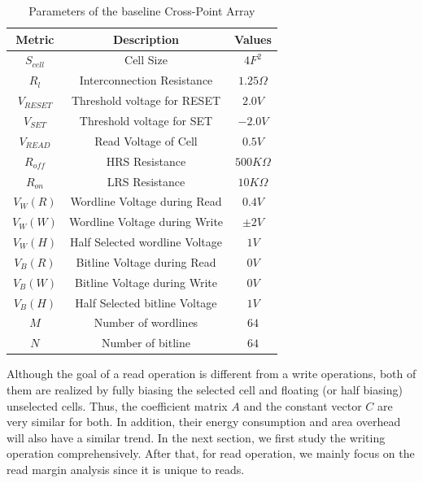 \begin{table}[!b]
  \centering
  \scriptsize
    \scriptsize
  \caption{Parameters of the baseline Cross-Point Array}\label{table:parameter}
  \vspace{-5pt}
  \begin{tabular}{c|c|c}
    \hline    \hline
    \textbf{Metric} & \textbf{Description} & \textbf{Values} \\
    \hline
    \textbf{$S_{cell}$} & Cell Size & \textbf{$4F^2$} \\
    \textbf{$R_l$} &  Interconnection Resistance&\textbf{$1.25\Omega$} \\
    \textbf{$V_{RESET}$} & Threshold voltage for RESET&\textbf{$2.0V$} \\
    \textbf{$V_{SET}$} & Threshold voltage for SET&\textbf{$-2.0V$} \\
    \textbf{$V_{READ}$} & Read Voltage of Cell&\textbf{$0.5V$} \\
    \textbf{$R_{off}$} & HRS Resistance &\textbf{$500K\Omega$} \\
    \textbf{$R_{on}$} & LRS Resistance &\textbf{$10K\Omega$} \\
    \textbf{$V_{W}(R)$} & Wordline Voltage during Read &\textbf{$0.4V$} \\
    \textbf{$V_{W}(W)$} & Wordline Voltage during Write  &\textbf{$\pm2V$} \\
    \textbf{$V_{W}(H)$} & Half Selected wordline Voltage &\textbf{$1V$} \\
    \textbf{$V_{B}(R)$} & Bitline Voltage during Read  &\textbf{$0V$} \\
    \textbf{$V_{B}(W)$} & Bitline Voltage during Write  &\textbf{$0V$} \\
    \textbf{$V_{B}(H)$} & Half Selected bitline Voltage &\textbf{$1V$} \\
    \textbf{$M$} & Number of wordlines &\textbf{$64$} \\
    \textbf{$N$} & Number of bitline &\textbf{$64$} \\
    \hline
  \end{tabular}
  \vspace{-10pt}
\end{table}

Although the goal of a read operation is different from a write operations, both of them are realized by fully biasing the selected cell and floating (or half biasing) unselected cells. Thus, the coefficient matrix $A$ and the constant vector $C$ are very similar for both. In addition, their energy consumption and area overhead will also have a similar trend. In the next section,  we first study the writing operation comprehensively.  After that, for read operation, we mainly focus on the read margin analysis since it is unique to reads.

